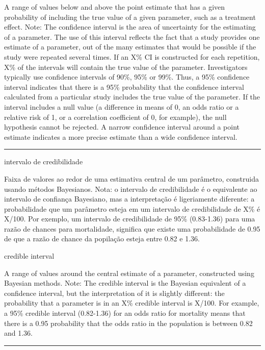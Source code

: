 \documentclass[
]{book}
\begin{document}
A range of values below and above the point estimate that has a given probability of including the true value of a given parameter, such as a treatment effect. Note: The confidence interval is the area of uncertainty for the estimating of a parameter. The use of this interval reflects the fact that a study provides one estimate of a parameter, out of the many estimates that would be possible if the study were repeated several times. If an X\% CI is constructed for each repetition, X\% of the intervals will contain the true value of the parameter. Investigators typically use confidence intervals of 90\%, 95\% or 99\%. Thus, a 95\% confidence interval indicates that there is a 95\% probability that the confidence interval calculated from a particular study includes the true value of the parameter. If the interval includes a null value (a difference in means of 0, an odds ratio or a relative risk of 1, or a correlation coefficient of 0, for example), the null hypothesis cannot be rejected. A narrow confidence interval around a point estimate indicates a more precise estimate than a wide confidence interval.

\begin{center}\rule{0.5\linewidth}{0.5pt}\end{center}

intervalo de credibilidade

Faixa de valores ao redor de uma estimativa central de um parâmetro, construida usando métodos Bayesianos. Nota: o intervalo de credibilidade é o equivalente ao intervalo de confiança Bayesiano, mas a interpretação é ligeriamente diferente: a probabilidade que um parâmetro esteja em um intervalo de credibilidade de X\% é X/100. Por exemplo, um intervalo de credibilidade de 95\% (0.83-1.36) para uma razão de chances para mortalidade, significa que existe uma probabilidade de 0.95 de que a razão de chance da popilação esteja entre 0.82 e 1.36.

credible interval

A range of values around the central estimate of a parameter, constructed using Bayesian methods. Note: The credible interval is the Bayesian equivalent of a confidence interval, but the interpretation of it is slightly different: the probability that a parameter is in an X\% credible interval is X/100. For example, a 95\% credible interval (0.82-1.36) for an odds ratio for mortality means that there is a 0.95 probability that the odds ratio in the population is between 0.82 and 1.36.

\begin{center}\rule{0.5\linewidth}{0.5pt}\end{center}
\end{document}

